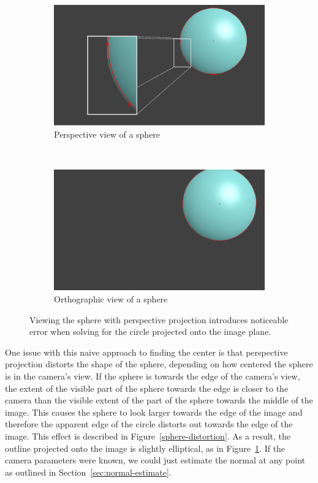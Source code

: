 \documentclass{thesis}
\begin{document}
\begin{figure}
	\centering
	\begin{subfigure}[b]{0.4\textwidth}
                \includegraphics[width=\textwidth]{sphere-perspective-zoom}
                \caption{Perspective view of a sphere}
    \end{subfigure}
    ~
   	\begin{subfigure}[b]{0.4\textwidth}
                \includegraphics[width=\textwidth]{sphere-ortho}
                \caption{Orthographic view of a sphere}
    \end{subfigure}
    \caption{Viewing the sphere with perspective projection introduces noticeable error when solving for the circle projected onto the image plane.}
	\label{sphere-perspective-ortho}
\end{figure}

One issue with this naive approach to finding the center is that perspective projection distorts the shape of the sphere, depending on how centered the sphere is in the camera's view. If the sphere is towards the edge of the camera's view, the extent of the visible part of the sphere towards the edge is closer to the camera than the visible extent of the part of the sphere towards the middle of the image. This causes the sphere to look larger towards the edge of the image and therefore the apparent edge of the circle distorts out towards the edge of the image. This effect is described in Figure~\ref{sphere-distortion}. As a result, the outline projected onto the image is slightly elliptical, as in Figure~\ref{sphere-perspective-ortho}. If the camera parameters were known, we could just estimate the normal at any point as outlined in Section~\ref{sec:normal-estimate}.
\end{document}

